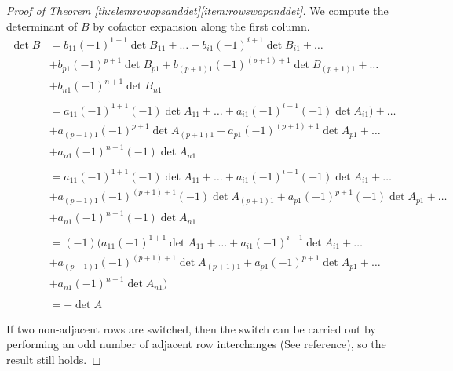 \documentclass{ximera}
\begin{document}
\begin{proof}[Proof of Theorem \ref{th:elemrowopsanddet}\ref{item:rowswapanddet}]
 We compute the determinant of $B$ by cofactor expansion along the first column.
 \begin{align*}
 \det{B}&=b_{11}(-1)^{1+1}\det{B_{11}}+\ldots +b_{i1}(-1)^{i+1}\det{B_{i1}}+\ldots\\
 &+b_{p1}(-1)^{p+1}\det{B_{p1}}+b_{(p+1)1}(-1)^{(p+1)+1}\det{B_{(p+1)1}}+\ldots\\
 &+b_{n1}(-1)^{n+1}\det{B_{n1}}\\
 \\
 &=a_{11}(-1)^{1+1}(-1)\det{A_{11}}+\ldots +a_{i1}(-1)^{i+1}(-1)\det{A}_{i1})+\ldots\\
 &+a_{(p+1)1}(-1)^{p+1}\det{A_{(p+1)1}}+a_{p1}(-1)^{(p+1)+1}\det{A_{p1}}+\ldots\\
 &+a_{n1}(-1)^{n+1}(-1)\det{A_{n1}}\\
 \\
 &=a_{11}(-1)^{1+1}(-1)\det{A_{11}}+\ldots +a_{i1}(-1)^{i+1}(-1)\det{A_{i1}}+\ldots\\
 &+a_{(p+1)1}(-1)^{(p+1)+1}(-1)\det{A_{(p+1)1}}+a_{p1}(-1)^{p+1}(-1)\det{A_{p1}}+\ldots\\
 &+a_{n1}(-1)^{n+1}(-1)\det{A_{n1}}\\
 \\
 &=(-1)\Big(a_{11}(-1)^{1+1}\det{A_{11}}+\ldots +a_{i1}(-1)^{i+1}\det{A_{i1}}+\ldots\\
 &+a_{(p+1)1}(-1)^{(p+1)+1}\det{A_{(p+1)1}}+a_{p1}(-1)^{p+1}\det{A_{p1}}+\ldots\\
 &+a_{n1}(-1)^{n+1}\det{A_{n1}}\Big)\\
 \\
 &=-\det{A}
 \end{align*}
 
 If two non-adjacent rows are switched, then the switch can be carried out by performing an odd number of adjacent row interchanges (See {\color{red} reference}), so the result still holds.
\end{proof}
\end{document}
